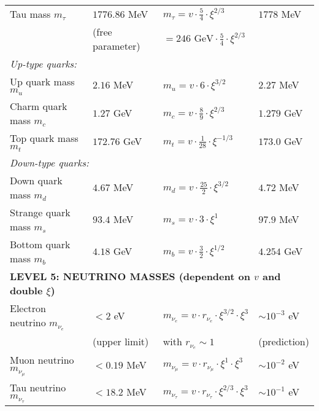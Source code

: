 \documentclass[12pt,a4paper]{article}
\begin{document}
\begin{longtable}{p{5cm}p{4cm}p{3.5cm}p{3.5cm}}
	Tau mass $m_\tau$ & $1776.86$ MeV & $m_\tau = v \cdot \frac{5}{4} \cdot \xi^{2/3}$ & $1778$ MeV \\
	& (free parameter) & $= 246 \text{ GeV} \cdot \frac{5}{4} \cdot \xi^{2/3}$ & \\[0.3em]
	
	\multicolumn{4}{l}{\textit{Up-type quarks:}} \\
	
	Up quark mass $m_u$ & $2.16$ MeV & $m_u = v \cdot 6 \cdot \xi^{3/2}$ & $2.27$ MeV \\
	
	Charm quark mass $m_c$ & $1.27$ GeV & $m_c = v \cdot \frac{8}{9} \cdot \xi^{2/3}$ & $1.279$ GeV \\
	
	Top quark mass $m_t$ & $172.76$ GeV & $m_t = v \cdot \frac{1}{28} \cdot \xi^{-1/3}$ & $173.0$ GeV \\
	
	\multicolumn{4}{l}{\textit{Down-type quarks:}} \\
	
	Down quark mass $m_d$ & $4.67$ MeV & $m_d = v \cdot \frac{25}{2} \cdot \xi^{3/2}$ & $4.72$ MeV \\
	
	Strange quark mass $m_s$ & $93.4$ MeV & $m_s = v \cdot 3 \cdot \xi^1$ & $97.9$ MeV \\
	
	Bottom quark mass $m_b$ & $4.18$ GeV & $m_b = v \cdot \frac{3}{2} \cdot \xi^{1/2}$ & $4.254$ GeV \\
	
	\midrule
	\multicolumn{4}{l}{\textbf{LEVEL 5: NEUTRINO MASSES (dependent on $v$ and double $\xi$)}} \\
	\midrule
	
	Electron neutrino $m_{\nu_e}$ & $< 2$ eV & $m_{\nu_e} = v \cdot r_{\nu_e} \cdot \xi^{3/2} \cdot \xi^3$ & $\sim 10^{-3}$ eV \\
	& (upper limit) & with $r_{\nu_e} \sim 1$ & (prediction) \\[0.3em]
	
	Muon neutrino $m_{\nu_\mu}$ & $< 0.19$ MeV & $m_{\nu_\mu} = v \cdot r_{\nu_\mu} \cdot \xi^{1} \cdot \xi^3$ & $\sim 10^{-2}$ eV \\
	
	Tau neutrino $m_{\nu_\tau}$ & $< 18.2$ MeV & $m_{\nu_\tau} = v \cdot r_{\nu_\tau} \cdot \xi^{2/3} \cdot \xi^3$ & $\sim 10^{-1}$ eV \\
	

\end{longtable}
\end{document}
